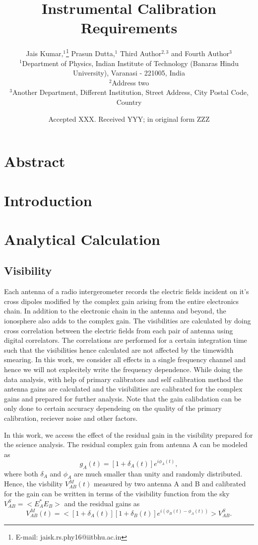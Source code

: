 \documentclass[fleqn,usenatbib]{mnras}
\title{Instrumental Calibration Requirements}
\author[Kumar et al.]{Jais Kumar,$^{1}$\thanks{E-mail: jaisk.rs.phy16@iitbhu.ac.in}
Prasun Dutta,$^{1}$
Third Author$^{2,3}$
and Fourth Author$^{3}$
\\
$^{1}$Department of Physics, Indian Institute of Technology (Banaras Hindu University), Varanasi - 221005, India\\
$^{2}$Address two\\
$^{3}$Another Department, Different Institution, Street Address, City Postal Code, Country
}
\date{Accepted XXX. Received YYY; in original form ZZZ}
\begin{document}
\label{firstpage}
\pagerange{\pageref{firstpage}--\pageref{lastpage}}
\maketitle

\section{Abstract}

\section{Introduction}

\section{Analytical Calculation}
\subsection{Visibility}
Each antenna of a radio intergerometer records the electric fields incident on it's cross dipoles modified by the complex gain arising from the entire electronics chain. In addition to the electronic chain in the antenna and beyond, the ionosphere also adds to the complex gain. The visibilities are calculated by doing cross correlation between the electric fields from each pair of antenna using digital correlators. The correlations are performed for a certain integration time such that the visibilities hence calculated are not affected by the timewidth smearing. In this work, we consider all effects in a single frequency channel and hence we will not explecitely write the frequency dependence. While doing the data analysis, with help of primary calibrators and self calibration method the antenna gains are calculated and the visibilities are calibrated for the complex gains and prepared for further analysis. Note that the gain calibdation can be only done to certain accuracy dependeing on the quality of the primary calibration, reciever noise and other factors.

In this work, we access the effect of the residual gain in the visibility prepared for the science analysis. The residual complex gain from antenna A can be modeled as 
\begin{equation}
 g_A(t) = \left [ 1+\delta_A(t) \right ]e^{i\phi_A(t)},
\end{equation}
where both $\delta_A$ and $\phi_A$ are much smaller than unity and randomly distributed. 
Hence, the visbility $V_{AB}^M(t)$ measured by two antenna A and B and calibrated for the gain can be written in terms of  the visibility function from the sky $V_{AB}^S = < E^*_A E_B>$ and the residual gains as
\begin{equation}
    V_{AB}^M(t) = < \left [ 1+\delta_A(t) \right ] \left [1+\delta_B(t)\right ] e^{i(\phi_B(t)-\phi_A(t))}> V_{AB}^S.
\end{equation}
\end{document}

